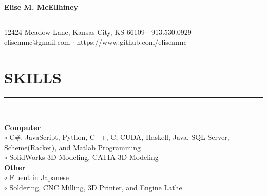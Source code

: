 \documentclass[twoside]{article}
\begin{document}
\begingroup
	\fontsize{20pt}{12pt}\selectfont
	\textbf{Elise M. McEllhiney}\\
\endgroup
\rule{\textwidth}{1.5pt}
\begin{center}
\vspace{-0.6em}
\small{12424 Meadow Lane, Kansas City, KS 66109 $\cdot$ 913.530.0929 $\cdot$ elisemmc@gmail.com $\cdot$ https://www.github.com/elisemmc}
\end{center}

\fontsize{9pt}{10.5pt}\selectfont

\section*{SKILLS}
\vspace{-1em}
\rule{\textwidth}{1pt}\\
\begin{adjustwidth}{0.2in}{0in}
\vspace{-1em}
\textbf{Computer}\\
$\circ$ C\#, JavaScript, Python, C++, C, CUDA, Haskell, Java, SQL Server, Scheme(Racket), and Matlab Programming\\
$\circ$ SolidWorks 3D Modeling, CATIA 3D Modeling\\
\textbf{Other}\\
$\circ$ Fluent in Japanese\\
$\circ$ Soldering, CNC Milling, 3D Printer, and Engine Lathe\\
\end{adjustwidth}
\end{document}
